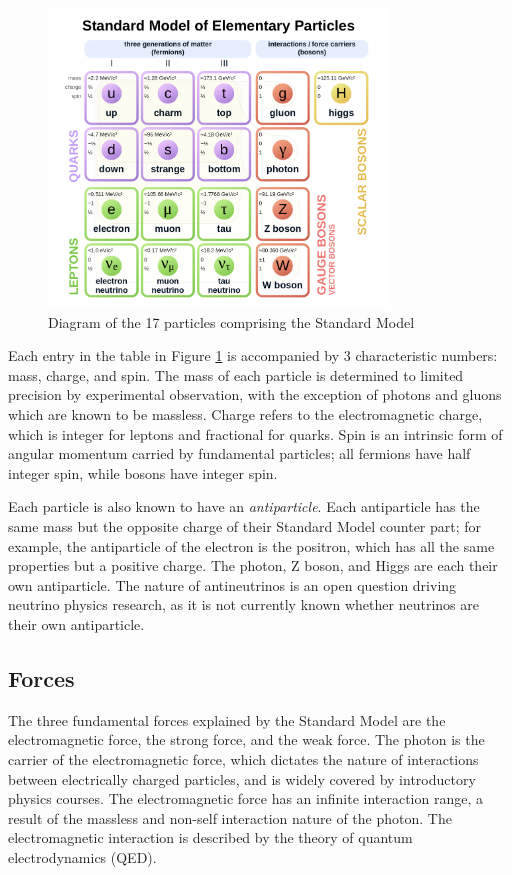 \begin{figure}
        \centering
	\includegraphics[width=0.8\textwidth]{figures/ch1/standard_model.png}
	\caption{Diagram of the 17 particles comprising the Standard Model}
	\label{fig:sm}
\end{figure}

Each entry in the table in Figure \ref{fig:sm} is accompanied by 3 characteristic numbers: mass, charge, and spin. The mass of each particle is determined to limited precision by experimental observation, with the exception of photons and gluons which are known to be massless. Charge refers to the electromagnetic charge, which is integer for leptons and fractional for quarks. Spin is an intrinsic form of angular momentum carried by fundamental particles; all fermions have half integer spin, while bosons have integer spin. \par

Each particle is also known to have an \textit{antiparticle}. Each antiparticle has the same mass but the opposite charge of their Standard Model counter part; for example, the antiparticle of the electron is the positron, which has all the same properties but a positive charge. The photon, Z boson, and Higgs are each their own antiparticle. The nature of antineutrinos is an open question driving neutrino physics research, as it is not currently known whether neutrinos are their own antiparticle. \par

\subsection{Forces}
The three fundamental forces explained by the Standard Model are the electromagnetic force, the strong force, and the weak force. The photon is the carrier of the electromagnetic force, which dictates the nature of interactions between electrically charged particles, and is widely covered by introductory physics courses. The electromagnetic force has an infinite interaction range, a result of the massless and non-self interaction nature of the photon. The electromagnetic interaction is described by the theory of quantum electrodynamics (QED).\par

